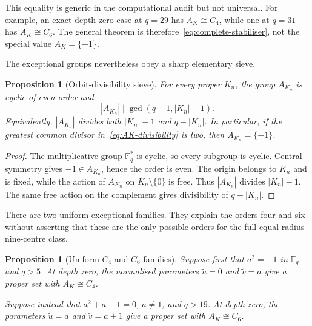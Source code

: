 \documentclass[11pt,a4paper]{article}
\newtheorem{proposition}[theorem]{Proposition}
\theoremstyle{definition}
\theoremstyle{remark}
\newcommand{\Fq}{\mathbb{F}_q}
\begin{document}
This equality is generic in the computational audit but not universal.
For example, an exact depth-zero case at $q=29$ has $A_K\cong C_4$, while one at $q=31$
has $A_K\cong C_6$.
The general theorem is therefore~\eqref{eq:complete-stabiliser}, not the special value
$A_K=\{\pm1\}$.

The exceptional groups nevertheless obey a sharp elementary sieve.

\begin{proposition}[Orbit-divisibility sieve]
  \label{prop:AK-divisibility}
  For every proper $K_n$, the group $A_{K_n}$ is cyclic of even order and
  \begin{equation}
    |A_{K_n}|\mid\gcd(q-1,|K_n|-1).
    \label{eq:AK-divisibility}
  \end{equation}
  Equivalently, $|A_{K_n}|$ divides both $|K_n|-1$ and $q-|K_n|$.
  In particular, if the greatest common divisor in~\eqref{eq:AK-divisibility} is two,
  then $A_{K_n}=\{\pm1\}$.
\end{proposition}

\begin{proof}
  The multiplicative group $\Fq^*$ is cyclic, so every subgroup is cyclic.
  Central symmetry gives $-1\in A_{K_n}$, hence the order is even.
  The origin belongs to $K_n$ and is fixed, while the action of $A_{K_n}$ on
  $K_n\setminus\{0\}$ is free.
  Thus $|A_{K_n}|$ divides $|K_n|-1$.
  The same free action on the complement gives divisibility of $q-|K_n|$.
\end{proof}

There are two uniform exceptional families.
They explain the orders four and six without asserting that these are the only possible
orders for the full equal-radius nine-centre class.

\begin{proposition}[Uniform $C_4$ and $C_6$ families]
  \label{prop:exceptional-families}
  Suppose first that $a^2=-1$ in $\Fq$ and $q>5$.
  At depth zero, the normalised parameters $\widetilde u=0$ and
  $\widetilde v=a$ give a proper set with $A_K\cong C_4$.

  Suppose instead that $a^2+a+1=0$, $a\ne1$, and $q>19$.
  At depth zero, the parameters $\widetilde u=a$ and
  $\widetilde v=a+1$ give a proper set with $A_K\cong C_6$.
\end{proposition}
\end{document}
